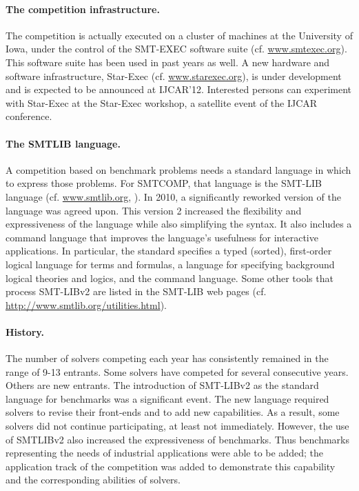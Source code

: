 \documentclass{llncs}
\begin{document}
\paragraph{The competition infrastructure.} The competition is actually executed on a cluster of machines at the University of Iowa, under the control of the SMT-EXEC software suite (cf. \url{www.smtexec.org}). This software suite has been used in past years as well. A new hardware and software infrastructure, Star-Exec (cf. \url{www.starexec.org}), is under development and is expected to be announced at IJCAR'12. Interested persons can experiment with Star-Exec at the Star-Exec workshop, a satellite event of the IJCAR conference.

\paragraph{The SMTLIB language.} A competition based on benchmark problems needs a standard language in which to express those problems.
For SMTCOMP, that language is the SMT-LIB language (cf. \url{www.smtlib.org}, \cite{BarST-SMT-10} \cite{Cok-SMTLIBTutorial-2011}). 
In 2010, a significantly reworked version of the language was agreed upon.
This version 2 increased the flexibility and expressiveness of the language while also simplifying the syntax. 
It also includes a command language that improves the language's usefulness for interactive applications.
In particular, the standard specifies a typed (sorted), first-order logical language for terms and formulas, a language for specifying background logical theories and logics, and the command language. Some other tools that process SMT-LIBv2 are listed in the SMT-LIB web pages (cf. \url{http://www.smtlib.org/utilities.html}).

\paragraph{History.} The number of solvers competing each year has consistently remained in the range of 9-13 entrants.
Some solvers have competed for several consecutive years. Others are new entrants. The introduction of SMT-LIBv2 as the standard language for benchmarks was a significant event. The new language required solvers to revise their front-ends and to add new capabilities.
As a result, some solvers did not continue participating, at least not immediately. However, the use of SMTLIBv2 also increased the expressiveness of benchmarks. Thus benchmarks representing the needs of industrial applications were able to be added; 
the application track of the competition was added to demonstrate this capability and the corresponding abilities of solvers.
\end{document}
